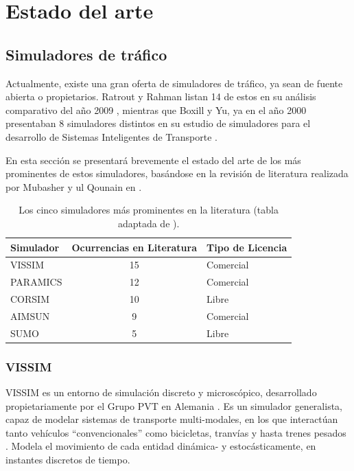 \section{Estado del arte}\label{sec:state_of_the_art}

\subsection{Simuladores de tráfico}

Actualmente, existe una gran oferta de simuladores de tráfico, ya sean de fuente abierta o propietarios. Ratrout y Rahman listan 14 de estos en su análisis comparativo del año 2009 \autocite{ratrout2009comparative}, mientras que Boxill y Yu, ya en el año 2000 presentaban 8 simuladores distintos en su estudio de simuladores para el desarrollo de Sistemas Inteligentes de Transporte \autocite{boxill2000evaluation}.

En esta sección se presentará brevemente el estado del arte de los más prominentes de estos simuladores, basándose en la revisión de literatura realizada por Mubasher y ul Qounain en \autocite{traffic_sim_review}.

\begin{table}
    \centering
    \begin{tabular}{@{}lcl@{}}
        \textbf{Simulador} & \multicolumn{1}{l}{\textbf{Ocurrencias en Literatura}} & \multicolumn{1}{l}{\textbf{Tipo de Licencia}} \\ \midrule
        VISSIM & 15 & Comercial \\
        PARAMICS & 12 & Comercial \\
        CORSIM & 10 & Libre \\
        AIMSUN & 9 & Comercial \\
        SUMO & 5 & Libre \\ \bottomrule
    \end{tabular}
    \caption[Tabla comparativa simuladores de tráfico.]{Los cinco simuladores más prominentes en la literatura (tabla adaptada de \autocite{traffic_sim_review}).}
    \label{table:prom_trafficsim}
\end{table}

\subsubsection{VISSIM}

VISSIM es un entorno de simulación discreto y microscópico, desarrollado propietariamente por el Grupo PVT en Alemania \autocite{vissim}. Es un simulador generalista, capaz de modelar sistemas de transporte multi-modales, en los que interactúan tanto vehículos ``convencionales'' como bicicletas, tranvías y hasta trenes pesados \autocite{fellendorf2010microscopic}. Modela el movimiento de cada entidad dinámica- y estocásticamente, en instantes discretos de tiempo. 

